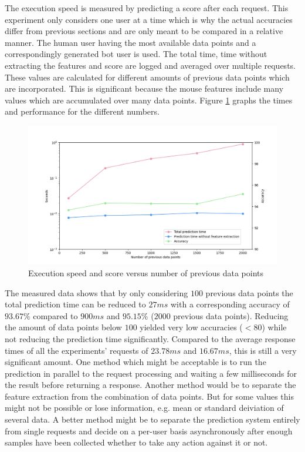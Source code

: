 \documentclass[
    fontsize=12pt,
    headings=small,
    parskip=half,           %
    bibliography=totoc,
    numbers=noenddot,       %
    open=any,               %
    final,                   %
    table
]{scrreprt}
\begin{document}
The execution speed is measured by predicting a score after each request. This experiment only considers one user at a time which is why the actual accuracies differ from previous sections and are only meant to be compared in a relative manner. The human user having the most available data points and a correspondingly generated bot user is used. The total time, time without extracting the features and score are logged and averaged over multiple requests. These values are calculated for different amounts of previous data points which are incorporated. This is significant because the mouse features include many values which are accumulated over many data points. Figure \ref{fig:speed_per_dp_count} graphs the times and performance for the different numbers.

\begin{figure}[H]
    \includegraphics[width=\textwidth]{figures/speed_per_dp_count.png}
    \caption{Execution speed and score versus number of previous data points}
    \label{fig:speed_per_dp_count}
\end{figure}

The measured data shows that by only considering $100$ previous data points the total prediction time can be reduced to $27ms$ with a corresponding accuracy of $93.67\%$ compared to $900ms$ and $95.15\%$ ($2000$ previous data points). Reducing the amount of data points below $100$ yielded very low accuracies ($<80$) while not reducing the prediction time significantly. Compared to the average response times of all the experiments' requests of $23.78ms$ and $16.67ms$, this is still a very significant amount. One method which might be acceptable is to run the prediction in parallel to the request processing and waiting a few milliseconds for the result before returning a response. Another method would be to separate the feature extraction from the combination of data points. But for some values this might not be possible or lose information, e.g. mean or standard deiviation of several data.
A better method might be to separate the prediction system entirely from single requests and decide on a per-user basis asynchronously after enough samples have been collected whether to take any action against it or not.
\end{document}
